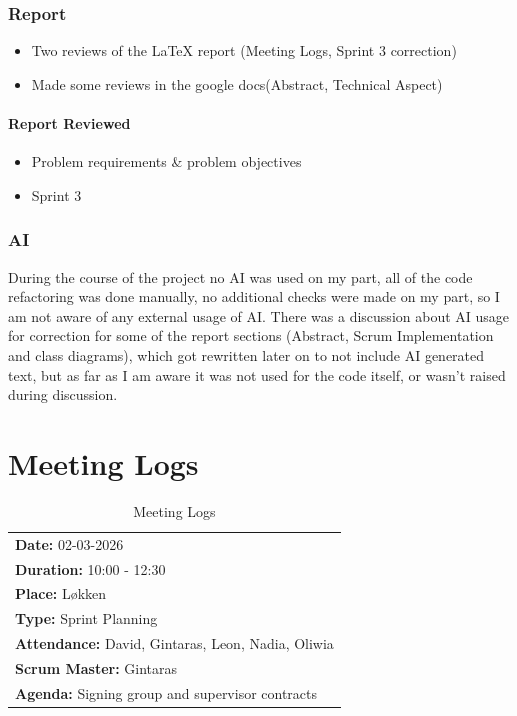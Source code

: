 \subsection*{Report}
\begin{itemize}
    \item Two reviews of the LaTeX report (Meeting Logs, Sprint 3 correction)
    \item Made some reviews in the google docs(Abstract, Technical Aspect)
\end{itemize}
\subsubsection*{Report Reviewed}
\begin{itemize}
    \item Problem requirements \& problem objectives
    \item Sprint 3
\end{itemize}
\subsection*{AI}
During the course of the project no AI was used on my part, all of the code refactoring was done manually, no additional checks were made on my part, so I am not aware of any external usage of AI. There was a discussion about AI usage for correction for some of the report sections (Abstract, Scrum Implementation and class diagrams), which got rewritten later on to not include AI generated text, but as far as I am aware it was not used for the code itself, or wasn’t raised during discussion.
\chapter{Meeting Logs}\label{appendix:meetinglogs}

\begin{table}[H]
    \centering
    \caption{Meeting Logs}
    \begin{tabular}{|p{15cm}|}   
        \hline
        \textbf{Date:}  02-03-2026 \\
        \textbf{Duration:}  10:00 - 12:30 \\
        \textbf{Place:}  Løkken \\
        \textbf{Type:}  Sprint Planning \\
        \textbf{Attendance:}  David, Gintaras, Leon, Nadia, Oliwia \\
        \textbf{Scrum Master:}  Gintaras \\
        \textbf{Agenda:}  Signing group and supervisor contracts \\
        \hline
    \end{tabular}
\end{table}

